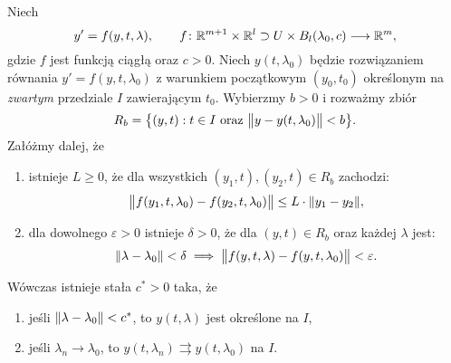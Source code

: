 %
\begin{theorem}
  Niech
%
  \begin{equation*}
    y' = f(y,t,\lambda), \qquad f \colon \R^{m+1} \times \R^l \supset U \times B_l(\lambda_0,c) \longrightarrow \R^m,
  \end{equation*}
%
  gdzie $f$ jest funkcją ciągłą oraz $c>0$. Niech $y(t,\lambda_0)$ będzie rozwiązaniem równania $y' = f(y,t,\lambda_0)$ 
  z warunkiem początkowym $(y_0,t_0)$ określonym na \emph{zwartym} przedziale $I$ zawierającym $t_0$. Wybierzmy $b > 0$ 
  i rozważmy zbiór
%
  \begin{equation*}
    R_b = \big\{ (y,t) : t \in I \text{ oraz } \norm[\big]{ y - y(t,\lambda_0) } < b \big\}.
  \end{equation*}
%
  Załóżmy dalej, że
%
  \begin{enumerate}[label=\alph*)]
    \item istnieje $L \geq 0$, że dla wszystkich $(y_1,t),(y_2,t) \in R_b$ zachodzi:
%
    \begin{equation*}
      \norm[\big]{ f(y_1,t,\lambda_0) - f(y_2,t,\lambda_0) } \leq L \cdot \norm{y_1-y_2},
    \end{equation*}
%
    \item \label{zalozenieb} dla dowolnego $\varepsilon>0$ istnieje $\delta>0$, że dla $(y,t) \in R_b$ oraz każdej 
    $\lambda$ jest:
%
    \begin{equation*}
      \norm{\lambda - \lambda_0} < \delta \implies \norm[\big]{ f(y,t,\lambda) - f(y,t,\lambda_0) } < \varepsilon.
    \end{equation*}
%
  \end{enumerate}
%
  Wówczas istnieje stała $c^{\ast} > 0$ taka, że
%
  \begin{enumerate}
    \item jeśli $\norm{\lambda-\lambda_0} < c^{\ast}$, to $y(t,\lambda)$ jest określone na $I$,
    \item jeśli $\lambda_n \to \lambda_0$, to $y(t,\lambda_n) \rightrightarrows y(t,\lambda_0)$ na $I$.
  \end{enumerate}
%
\end{theorem}
%
